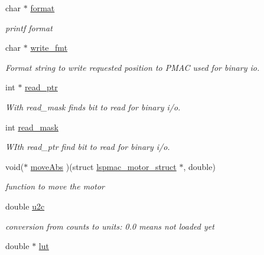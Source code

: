 \begin{DoxyCompactItemize}
char $\ast$ \hyperlink{structlspmac__motor__struct_aba3d9d00271187128506bbbb1d77da19}{format}
\begin{DoxyCompactList}\small\item\em printf format \item\end{DoxyCompactList}\item 
char $\ast$ \hyperlink{structlspmac__motor__struct_a70291ddfe7994c0bec7fc2287cb6dd89}{write\_\-fmt}
\begin{DoxyCompactList}\small\item\em Format string to write requested position to PMAC used for binary io. \item\end{DoxyCompactList}\item 
int $\ast$ \hyperlink{structlspmac__motor__struct_a844b28ccabab5048ca216db074fb9704}{read\_\-ptr}
\begin{DoxyCompactList}\small\item\em With read\_\-mask finds bit to read for binary i/o. \item\end{DoxyCompactList}\item 
int \hyperlink{structlspmac__motor__struct_a3c24ed30c5a3ad490c6139b2780b2af7}{read\_\-mask}
\begin{DoxyCompactList}\small\item\em WIth read\_\-ptr find bit to read for binary i/o. \item\end{DoxyCompactList}\item 
void($\ast$ \hyperlink{structlspmac__motor__struct_a20db3de86854b627815b3d940555ea75}{moveAbs} )(struct \hyperlink{structlspmac__motor__struct}{lspmac\_\-motor\_\-struct} $\ast$, double)
\begin{DoxyCompactList}\small\item\em function to move the motor \item\end{DoxyCompactList}\item 
double \hyperlink{structlspmac__motor__struct_a61415627ab2dc0f438b190d117e532db}{u2c}
\begin{DoxyCompactList}\small\item\em conversion from counts to units: 0.0 means not loaded yet \item\end{DoxyCompactList}\item 
double $\ast$ \hyperlink{structlspmac__motor__struct_a7b43671f7f3e06521f6cf91fb9ac707d}{lut}

\end{DoxyCompactItemize}
